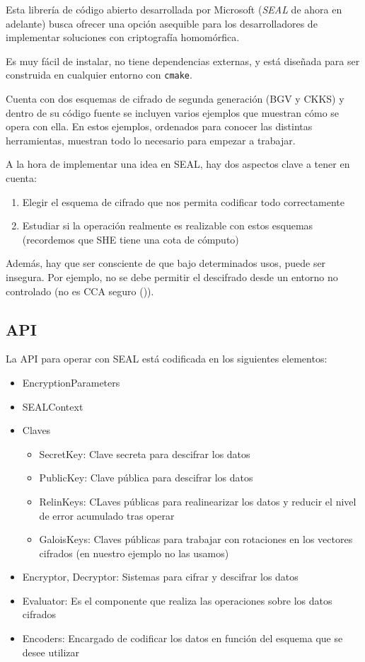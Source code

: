Esta librería de código abierto desarrollada por Microsoft (\textit{SEAL} de ahora en adelante) busca ofrecer una opción asequible para los desarrolladores de implementar soluciones con criptografía homomórfica.

Es muy fácil de instalar, no tiene dependencias externas, y está diseñada para ser construida en cualquier entorno con \verb|cmake|.

Cuenta con dos esquemas de cifrado de segunda generación (BGV y CKKS) y dentro de su código fuente se incluyen varios ejemplos que muestran cómo se opera con ella. En estos ejemplos, ordenados para conocer las distintas herramientas, muestran todo lo necesario para empezar a trabajar.

A la hora de implementar una idea en SEAL, hay dos aspectos clave a tener en cuenta:

\begin{enumerate}
  \item Elegir el esquema de cifrado que nos permita codificar todo correctamente
  \item Estudiar si la operación realmente es realizable con estos esquemas (recordemos que SHE tiene una cota de cómputo)
\end{enumerate}

Además, hay que ser consciente de que bajo determinados usos, puede ser insegura. Por ejemplo, no se debe permitir el descifrado desde un entorno no controlado (no es CCA seguro (\cite{peng_danger_2019})).

\subsection{API}

La API para operar con SEAL está codificada en los siguientes elementos:

\begin{itemize}
  \item EncryptionParameters
  \item SEALContext
  \item Claves
  \begin{itemize}
    \item SecretKey: Clave secreta para descifrar los datos
    \item PublicKey: Clave pública para descifrar los datos
    \item RelinKeys: CLaves públicas para realinearizar los datos y reducir el nivel de error acumulado tras operar
    \item GaloisKeys: Claves públicas para trabajar con rotaciones en los vectores cifrados (en nuestro ejemplo no las usamos)
  \end{itemize}
  \item Encryptor, Decryptor: Sistemas para cifrar y descifrar los datos
  \item Evaluator: Es el componente que realiza las operaciones sobre los datos cifrados
  \item Encoders: Encargado de codificar los datos en función del esquema que se desee utilizar
\end{itemize}

